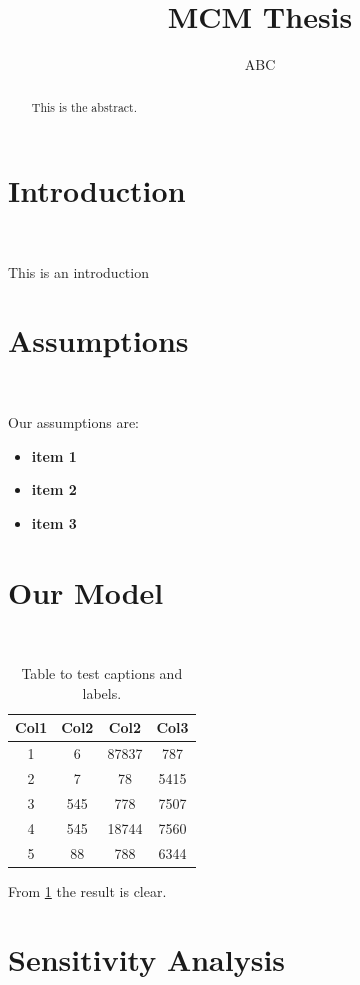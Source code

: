\documentclass[20pt]{article}
\title{\textbf{MCM Thesis}}
\author{ABC}
\theoremstyle{definition}
\begin{document}
\maketitle

\begin{abstract}
	This is the abstract.
\end{abstract}

\newpage

\tableofcontents
\newpage

\section  {Introduction} \ 

This is an introduction \cite{urban} \cite{barringer2020worldwide} \cite{horton2021mcm}
\section  {Assumptions} \ 

Our assumptions are:

\begin{itemize}
	\item \textbf{item 1} 
	\item \textbf{item 2}
	\item \textbf{item 3}
\end{itemize}

\section  {Our Model} \ 

\begin{table}[h!]
\centering
\begin{tabular}{|c|c c c|} 
 \hline
 Col1 & Col2 & Col2 & Col3 \\ [0.5ex] 
 \hline
 1 & 6 & 87837 & 787 \\ 
 2 & 7 & 78 & 5415 \\
 3 & 545 & 778 & 7507 \\
 4 & 545 & 18744 & 7560 \\
 5 & 88 & 788 & 6344 \\ [1ex] 
 \hline
\end{tabular}
\caption{Table to test captions and labels.}
\label{tab:1}
\end{table}

From \cref{tab:1} the result is clear.


\section {Sensitivity Analysis} \ 
\end{document}
